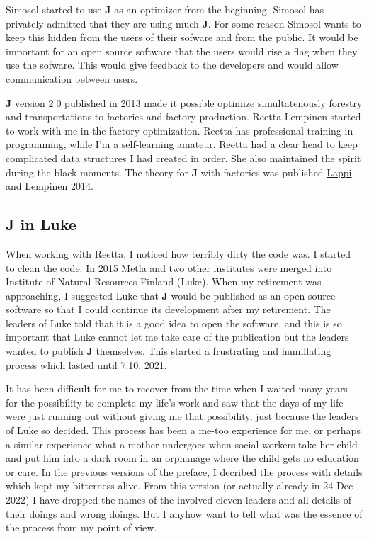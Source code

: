 Simosol started to use \textbf{J} as an 
optimizer from the beginning. Simosol has privately admitted 
that they are using much \textbf{J}. 
For some reason Simosol 
wants to keep this hidden from the users of their sofware and from the public. 
It would be important for an open source software that 
the users would rise a flag when they use the sofware. 
This would give feedback to the developers 
and would allow communication between users. 
 
\textbf{J} version 2.0 published in 2013 made it possible optimize simultatenously 
forestry and transportations to factories 
and factory production. 
Reetta Lempinen started to work with me in the factory optimization. 
Reetta has professional 
training in programming, while I'm a self-learning amateur. 
Reetta had a clear head to keep complicated data structures I had created in order. 
She also maintained the spirit during the black moments. The theory for \textbf{J} with factories was published 
\href{run:./lappilempinen.pdf}{Lappi and Lempinen 2014}. 
 
 
\subsection*{J in Luke} 
When working with Reetta, I noticed how terribly dirty the code was. I started to clean the 
code. 
In 2015 Metla and 
two other institutes were merged into Institute of Natural Resources Finland (Luke). 
When my retirement was approaching, I suggested Luke that \textbf{J} would be published as 
an open source software so that I could continue its development after my retirement. 
The leaders of Luke told that it is a good idea to open the software, and this is so important that 
Luke cannot let me take care of the publication but the leaders wanted to publish \textbf{J} 
themselves. This started a frustrating and humillating process which lasted until 7.10. 2021. 
 
It has been difficult for me to recover from the time when I waited many years 
for the possibility to complete my life's work and saw that the days of my life were just running out without 
giving me that possibility, just because the leaders of Luke so decided. This process has been 
a me-too experience for me, or perhaps a similar experience what 
a mother undergoes when social workers take her child and put him into a dark room in an orphanage 
where the child gets no education or care. In the previous versions of the preface, I decribed the process with details which 
kept my bitterness alive. From this version (or actually already in 24 Dec 2022)  I have dropped the names of the involved eleven leaders and all details of their doings 
and wrong doings. But I anyhow want to tell what was the essence of the process from my point of view. 
 
